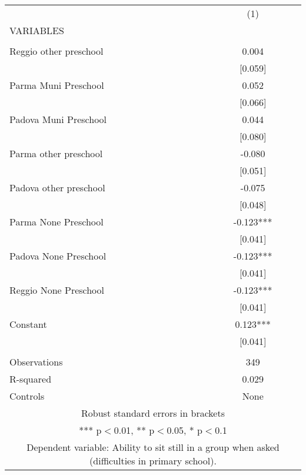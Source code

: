 \begin{tabular}{lc} \hline
 & (1) \\
VARIABLES &  \\ \hline
 &  \\
Reggio other preschool & 0.004 \\
 & [0.059] \\
Parma Muni Preschool & 0.052 \\
 & [0.066] \\
Padova Muni Preschool & 0.044 \\
 & [0.080] \\
Parma other preschool & -0.080 \\
 & [0.051] \\
Padova other preschool & -0.075 \\
 & [0.048] \\
Parma None Preschool & -0.123*** \\
 & [0.041] \\
Padova None Preschool & -0.123*** \\
 & [0.041] \\
Reggio None Preschool & -0.123*** \\
 & [0.041] \\
Constant & 0.123*** \\
 & [0.041] \\
 &  \\
Observations & 349 \\
R-squared & 0.029 \\
 Controls & None \\ \hline
\multicolumn{2}{c}{ Robust standard errors in brackets} \\
\multicolumn{2}{c}{ *** p$<$0.01, ** p$<$0.05, * p$<$0.1} \\
\multicolumn{2}{c}{ Dependent variable: Ability to sit still in a group when asked (difficulties in primary school).} \\
\end{tabular}
